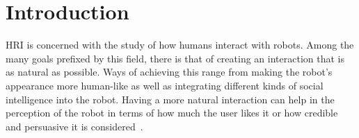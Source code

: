 \documentclass[nomenclature, english, biblatex]{kththesis}
\begin{document}
\cleardoublepage
\listoffigures

\cleardoublepage

\listoftables
\cleardoublepage
\cleardoublepage
\printglossary[style=mylong, type=\acronymtype, title={List of acronyms and abbreviations}]

\ifnomenclature
    \cleardoublepage
    \printnomenclature
\fi

\label{pg:lastPageofPreface}
\mainmatter
\glsresetall
\renewcommand{\chaptermark}[1]{\markboth{#1}{}}
\chapter{Introduction}
\label{ch:introduction}
\gls{HRI} is concerned with the study of how humans interact with robots. Among the many goals prefixed by this field, there is that of creating an interaction that is as natural as possible. Ways of achieving this range from making the robot's appearance more human-like as well as integrating different kinds of social intelligence into the robot. Having a more natural interaction can help in the perception of the robot in terms of how much the user likes it or how credible and persuasive it is considered~\cite{salem2012generation, salem2013err, sidner2004look, ullrich2017robot, aly2012robot, mobahi2003fuzzy}.
\end{document}
